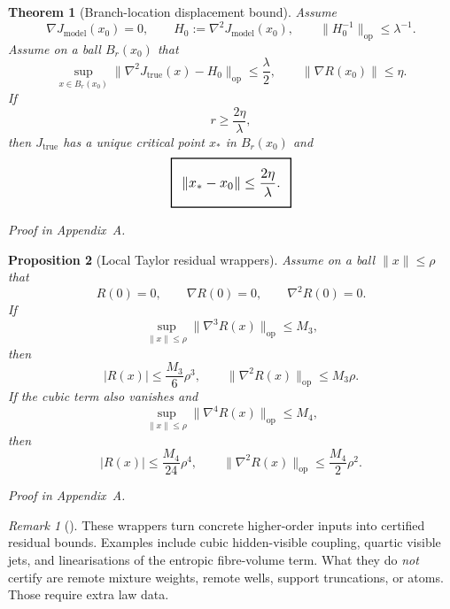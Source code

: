 \documentclass[11pt,a4paper]{article}
\numberwithin{equation}{section}
\newcommand{\geomboxed}[1]{%
  \setlength{\fboxsep}{8pt}%
  \setlength{\fboxrule}{0.9pt}%
  \fbox{\scalebox{1.12}{$\displaystyle #1$}}%
}
\theoremstyle{thmcompact}
\newtheorem{theorem}{Theorem}[section]
\newtheorem{proposition}[theorem]{Proposition}
\theoremstyle{remark}
\newtheorem*{remarkplain}{Remark}
\newenvironment{remark}[1][]%
{\begin{remarkbox}\begin{remarkplain}[#1]\normalfont}
{\end{remarkplain}\end{remarkbox}}
\newcommand{\proofappendix}{\par{\hfill\scriptsize\emph{Proof in Appendix~A.}}\par}
\begin{document}
\begin{theorem}[Branch-location displacement bound]
\label{thm:drift-bound}
Assume
\begin{equation}
\nabla J_{\mathrm{model}}(x_0)=0,
\qquad
H_0:=\nabla^2J_{\mathrm{model}}(x_0),
\qquad
\|H_0^{-1}\|_{\mathrm{op}}\le \lambda^{-1}.
\end{equation}
Assume on a ball $B_r(x_0)$ that
\begin{equation}
\sup_{x\in B_r(x_0)}\|\nabla^2J_{\mathrm{true}}(x)-H_0\|_{\mathrm{op}}\le \frac{\lambda}{2},
\qquad
\|\nabla R(x_0)\|\le \eta.
\end{equation}
If
\begin{equation}
r\ge \frac{2\eta}{\lambda},
\end{equation}
then $J_{\mathrm{true}}$ has a unique critical point $x_*$ in $B_r(x_0)$ and
\begin{equation}
\geomboxed{\|x_*-x_0\|\le \frac{2\eta}{\lambda}.}
\end{equation}
\end{theorem}

\proofappendix

\begin{proposition}[Local Taylor residual wrappers]
\label{prop:taylor-wrappers}
Assume on a ball $\|x\|\le \rho$ that
\begin{equation}
R(0)=0,
\qquad
\nabla R(0)=0,
\qquad
\nabla^2R(0)=0.
\end{equation}
If
\begin{equation}
\sup_{\|x\|\le \rho}\|\nabla^3R(x)\|_{\mathrm{op}}\le M_3,
\end{equation}
then
\begin{equation}
|R(x)|\le \frac{M_3}{6}\rho^3,
\qquad
\|\nabla^2R(x)\|_{\mathrm{op}}\le M_3\rho.
\end{equation}
If the cubic term also vanishes and
\begin{equation}
\sup_{\|x\|\le \rho}\|\nabla^4R(x)\|_{\mathrm{op}}\le M_4,
\end{equation}
then
\begin{equation}
|R(x)|\le \frac{M_4}{24}\rho^4,
\qquad
\|\nabla^2R(x)\|_{\mathrm{op}}\le \frac{M_4}{2}\rho^2.
\end{equation}
\end{proposition}

\proofappendix

\begin{remark}
These wrappers turn concrete higher-order inputs into certified residual bounds. Examples include cubic hidden-visible coupling, quartic visible jets, and linearisations of the entropic fibre-volume term. What they do \emph{not} certify are remote mixture weights, remote wells, support truncations, or atoms. Those require extra law data.
\end{remark}
\end{document}
